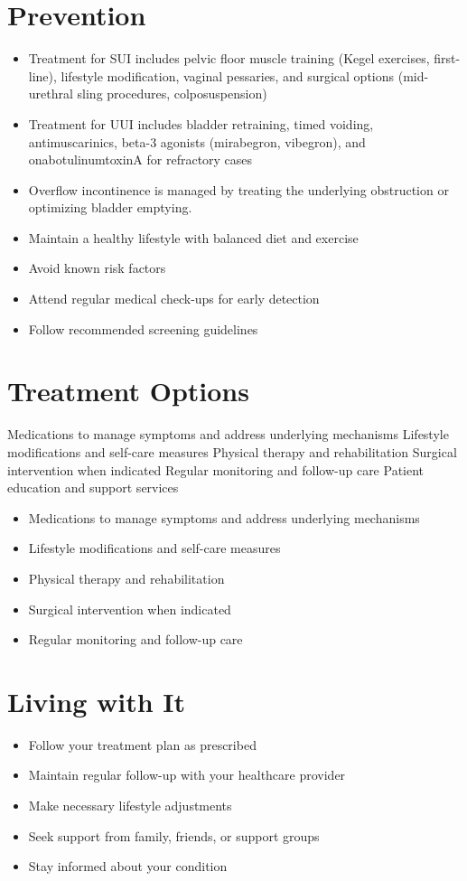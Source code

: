 \section{Prevention}
\begin{itemize}[noitemsep]
  \item Treatment for SUI includes pelvic floor muscle training (Kegel exercises, first-line), lifestyle modification, vaginal pessaries, and surgical options (mid-urethral sling procedures, colposuspension)
  \item Treatment for UUI includes bladder retraining, timed voiding, antimuscarinics, beta-3 agonists (mirabegron, vibegron), and onabotulinumtoxinA for refractory cases
  \item Overflow incontinence is managed by treating the underlying obstruction or optimizing bladder emptying.
  \item Maintain a healthy lifestyle with balanced diet and exercise
  \item Avoid known risk factors
  \item Attend regular medical check-ups for early detection
  \item Follow recommended screening guidelines
\end{itemize}
\section{Treatment Options}
Medications to manage symptoms and address underlying mechanisms Lifestyle modifications and self-care measures Physical therapy and rehabilitation Surgical intervention when indicated Regular monitoring and follow-up care Patient education and support services

\begin{itemize}[noitemsep]
  \item Medications to manage symptoms and address underlying mechanisms
  \item Lifestyle modifications and self-care measures
  \item Physical therapy and rehabilitation
  \item Surgical intervention when indicated
  \item Regular monitoring and follow-up care
\end{itemize}
\section{Living with It}
\begin{itemize}[noitemsep]
  \item Follow your treatment plan as prescribed
  \item Maintain regular follow-up with your healthcare provider
  \item Make necessary lifestyle adjustments
  \item Seek support from family, friends, or support groups
  \item Stay informed about your condition
\end{itemize}
